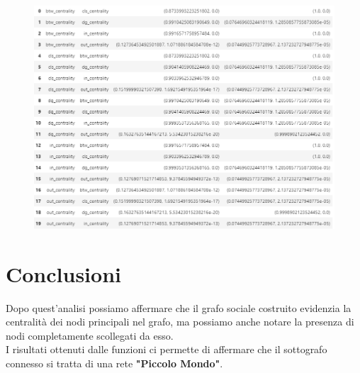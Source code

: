 \documentclass[a4paper,11pt]{report}
\begin{document}
\begin{figure}[ht]
	\centering
	\includegraphics[width=0.9\linewidth]{tabella}
	\caption[Tabella della Correlazione di Pearson e Kendel relativa alle misure di centralità del grafo]{}
\end{figure}



\section{Conclusioni}
Dopo quest'analisi possiamo affermare che il grafo sociale costruito evidenzia la centralità dei nodi principali nel grafo, ma possiamo anche notare la presenza di nodi completamente scollegati da esso.\\
I risultati ottenuti dalle funzioni ci permette di affermare che il sottografo connesso si tratta di una rete \textbf{"Piccolo Mondo"}. \\
\pagebreak
\end{document}
